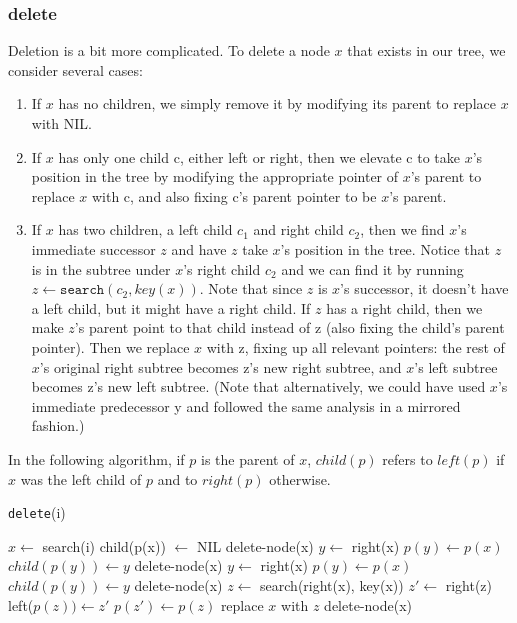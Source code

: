 \documentclass [12pt]{article}
\begin{document}
\subsubsection{delete}
Deletion is a bit more complicated. To delete a node $x$ that exists in our tree, we consider several cases:
\begin{enumerate}
  \item If $x$ has no children, we simply remove it by modifying its parent to replace $x$ with NIL.
  \item If $x$ has only one child c, either left or right, then we elevate c to take $x$'s position in the tree by modifying the appropriate pointer of $x$'s parent to replace $x$ with c, and also fixing c's parent pointer to be $x$'s parent.
  \item  If $x$ has two children, a left child $c_1$ and right child $c_2$, then we find $x$'s immediate successor $z$ and have $z$ take $x$'s position in the tree. Notice that $z$ is in the subtree under $x$'s right child $c_2$ and we can find it by running $z \gets \texttt{search}(c_2, key(x))$. Note that since $z$ is $x$'s successor, it doesn't have a left child, but it might have a right child. If $z$ has a right child, then we make $z$'s parent point to that child instead of z (also fixing the child's parent pointer). Then we replace $x$ with z, fixing up all relevant pointers: the rest of $x$'s original right subtree becomes z's new right subtree, and $x$'s left subtree becomes z's new left subtree. (Note that alternatively, we could have used $x$'s immediate predecessor y and followed the same analysis in a mirrored fashion.)

\end{enumerate}
In the following algorithm, if $p$ is the parent of $x$, $child(p)$ refers to $left(p)$ if $x$ was the left child of $p$ and to $right(p)$ otherwise.

\begin{algorithm}
\caption{\texttt{delete}(i)}\label{alg:bst_delete}
\begin{algorithmic}
\STATE $x \gets $ search(i)
  \RETURN
\ENDIF
{} 
  \STATE child(p(x)) $\gets$ NIL
  \STATE delete-node(x)
\ENDIF
{}
  \STATE $y \gets $ right(x)
  \STATE $p(y) \gets p(x)$
  \STATE $child(p(y)) \gets y$
  \STATE delete-node(x)
  \STATE $y \gets $ right(x)
  \STATE $p(y) \gets p(x)$
  \STATE $child(p(y)) \gets y$
  \STATE delete-node(x)
\ELSE
  \STATE $z \gets $ search(right(x), key(x))
  \STATE $z' \gets$ right(z)
  \STATE left($p(z)) \gets z'$
  \STATE $p(z') \gets p(z)$
  \STATE replace $x$ with $z$
  \STATE delete-node(x)
\ENDIF
\end{algorithmic}
\end{algorithm}
\end{document}
